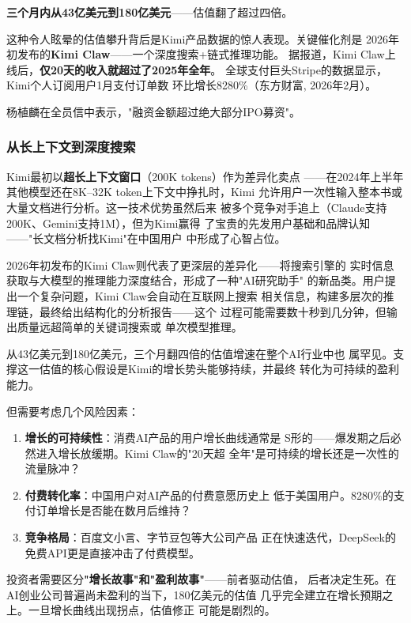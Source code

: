 \textbf{三个月内从43亿美元到180亿美元}——估值翻了超过四倍。

这种令人眩晕的估值攀升背后是Kimi产品数据的惊人表现。关键催化剂是
2026年初发布的\textbf{Kimi Claw}——一个深度搜索+链式推理功能。
据报道，Kimi Claw上线后，\textbf{仅20天的收入就超过了2025年全年}。
全球支付巨头Stripe的数据显示，Kimi个人订阅用户1月支付订单数
环比增长8280\%（东方财富, 2026年2月）。

杨植麟在全员信中表示，"融资金额超过绝大部分IPO募资"。

\subsubsection{从长上下文到深度搜索}
Kimi最初以\textbf{超长上下文窗口}（200K tokens）作为差异化卖点
——在2024年上半年其他模型还在8K--32K token上下文中挣扎时，Kimi
允许用户一次性输入整本书或大量文档进行分析。这一技术优势虽然后来
被多个竞争对手追上（Claude支持200K、Gemini支持1M），但为Kimi赢得
了宝贵的先发用户基础和品牌认知——"长文档分析找Kimi"在中国用户
中形成了心智占位。

2026年初发布的Kimi Claw则代表了更深层的差异化——将搜索引擎的
实时信息获取与大模型的推理能力深度结合，形成了一种"AI研究助手"
的新品类。用户提出一个复杂问题，Kimi Claw会自动在互联网上搜索
相关信息，构建多层次的推理链，最终给出结构化的分析报告——这个
过程可能需要数十秒到几分钟，但输出质量远超简单的关键词搜索或
单次模型推理。

\begin{warnbox}[月之暗面的估值泡沫风险]
从43亿美元到180亿美元，三个月翻四倍的估值增速在整个AI行业中也
属罕见。支撑这一估值的核心假设是Kimi的增长势头能够持续，并最终
转化为可持续的盈利能力。

但需要考虑几个风险因素：
\begin{enumerate}
  \item \textbf{增长的可持续性}：消费AI产品的用户增长曲线通常是
    S形的——爆发期之后必然进入增长放缓期。Kimi Claw的"20天超
    全年"是可持续的增长还是一次性的流量脉冲？
  \item \textbf{付费转化率}：中国用户对AI产品的付费意愿历史上
    低于美国用户。8280\%的支付订单增长是否能在数月后维持？
  \item \textbf{竞争格局}：百度文小言、字节豆包等大公司产品
    正在快速迭代，DeepSeek的免费API更是直接冲击了付费模型。
\end{enumerate}

投资者需要区分\textbf{"增长故事"和"盈利故事"}——前者驱动估值，
后者决定生死。在AI创业公司普遍尚未盈利的当下，180亿美元的估值
几乎完全建立在增长预期之上。一旦增长曲线出现拐点，估值修正
可能是剧烈的。
\end{warnbox}

